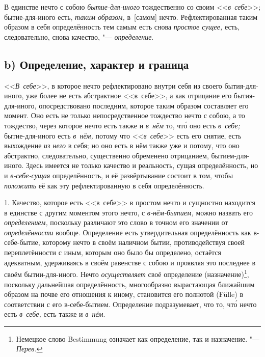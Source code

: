 В единстве нечто с собою {\em бытие-для-иного}
тождественно со своим <<{\em в~себе}>>; бытие-для-иного
есть, {\em таким образом,} в~[самом] нечто.
Рефлектированная таким образом в себя определённость тем самым есть снова
{\em простое сущее,} есть, следовательно, снова
качество, "--- {\em определение}.

\subsection[b) Определение, характер и граница]{b) Определение, характер и граница}

<<{\em В~себе}>>, в которое нечто рефлектировано внутри
себя из своего бытия-для-иного, уже более не есть абстрактное <<в~себе>>,
а как отрицание его бытия-для-иного, опосредствовано последним, которое
таким образом составляет его момент. Оно есть не только непосредственное
тождество нечто с собою, а то тождество, через которое нечто есть также и
{\em в~нём} то, чт\'{о} оно есть {\em в~себе;}
бытие-для-иного есть {\em в~нём,} потому что
<<{\em в~себе}>> есть его снятие, есть выхождение
{\em из него} в себя; но оно есть в нём также уже и
потому, что оно абстрактно, следовательно, существенно обременено
отрицанием, бытием-для-иного. Здесь имеется не только качество и
реальность, сущая определённость, но и
{\em в-себе-сущая} определённость, и её развёртывание
состоит в том, чтобы {\em положить} её как эту
рефлектированную в себя определённость.

1. Качество, которое есть <<в~себе>> в простом нечто и сущностно находится в
единстве с другим моментом этого нечто, с {\em в-нём-бытием,} можно назвать его
{\em определением,} поскольку различают это слово в точном его значении от
{\em определённости} вообще. Определение есть утвердительная определённость как
в-себе-бытие, которому нечто в своём наличном бытии, противодействуя своей
переплетённости с иным, которым оно было бы определено, остаётся адекватным,
удерживаясь в своём равенстве с собою и проявляя это последнее в своём
бытии-для-иного. Нечто {\em осуществляет} своё определение
(назначение)\footnote{Немецкое слово Bestimmung означает как определение, так и
назначение. "--- {\em Перев.}}, поскольку дальнейшая определённость,
многообразно вырастающая ближайшим образом на почве его отношения к иному,
становится его полнотой (Fülle) в соответствии с его в-себе-бытием. Определение
подразумевает, что то, чт\'{о} нечто есть {\em в~себе,} есть также и
{\em в~нём}.


